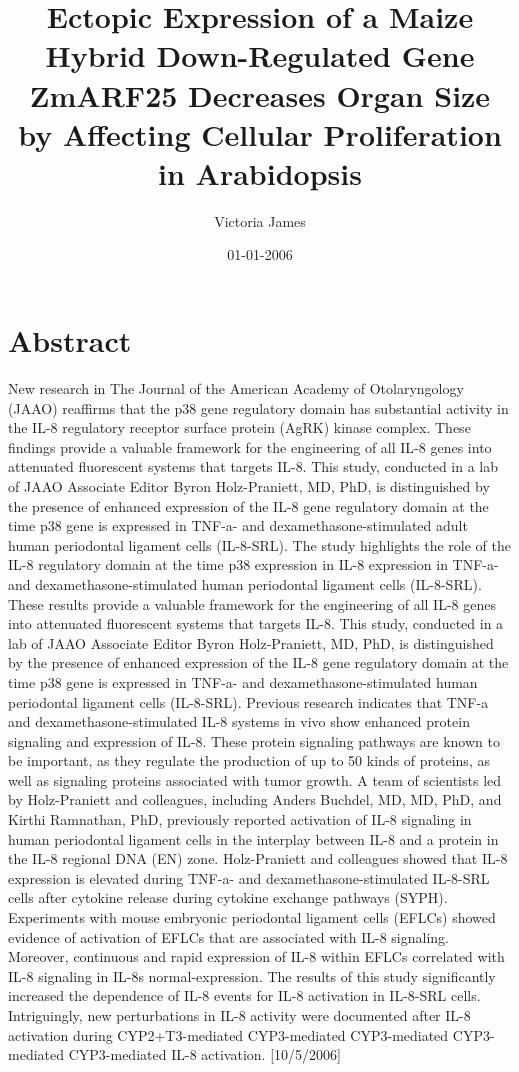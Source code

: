 \documentclass{article}%
\title{Ectopic Expression of a Maize Hybrid Down{-}Regulated Gene ZmARF25 Decreases Organ Size by Affecting Cellular Proliferation in Arabidopsis}%
\author{Victoria James}%
\affil{Departments of Medicine, Biochemistry and Molecular Biology, Indiana University School of Medicine, The Melvin and Bren Simon Cancer Center and the Center for Pancreatic Cancer Research, Indianapolis, Indiana, United States of America}%
\date{01{-}01{-}2006}%
\begin{document}
%
\normalsize%
\maketitle%
\section{Abstract}%
\label{sec:Abstract}%
New research in The Journal of the American Academy of Otolaryngology (JAAO) reaffirms that the p38 gene regulatory domain has substantial activity in the IL{-}8 regulatory receptor surface protein (AgRK) kinase complex. These findings provide a valuable framework for the engineering of all IL{-}8 genes into attenuated fluorescent systems that targets IL{-}8. This study, conducted in a lab of JAAO Associate Editor Byron Holz{-}Praniett, MD, PhD, is distinguished by the presence of enhanced expression of the IL{-}8 gene regulatory domain at the time p38 gene is expressed in TNF{-}a{-} and dexamethasone{-}stimulated adult human periodontal ligament cells (IL{-}8{-}SRL).\newline%
The study highlights the role of the IL{-}8 regulatory domain at the time p38 expression in IL{-}8 expression in TNF{-}a{-} and dexamethasone{-}stimulated human periodontal ligament cells (IL{-}8{-}SRL). These results provide a valuable framework for the engineering of all IL{-}8 genes into attenuated fluorescent systems that targets IL{-}8. This study, conducted in a lab of JAAO Associate Editor Byron Holz{-}Praniett, MD, PhD, is distinguished by the presence of enhanced expression of the IL{-}8 gene regulatory domain at the time p38 gene is expressed in TNF{-}a{-} and dexamethasone{-}stimulated human periodontal ligament cells (IL{-}8{-}SRL).\newline%
Previous research indicates that TNF{-}a and dexamethasone{-}stimulated IL{-}8 systems in vivo show enhanced protein signaling and expression of IL{-}8. These protein signaling pathways are known to be important, as they regulate the production of up to 50 kinds of proteins, as well as signaling proteins associated with tumor growth. A team of scientists led by Holz{-}Praniett and colleagues, including Anders Buchdel, MD, MD, PhD, and Kirthi Ramnathan, PhD, previously reported activation of IL{-}8 signaling in human periodontal ligament cells in the interplay between IL{-}8 and a protein in the IL{-}8 regional DNA (EN) zone.\newline%
Holz{-}Praniett and colleagues showed that IL{-}8 expression is elevated during TNF{-}a{-} and dexamethasone{-}stimulated IL{-}8{-}SRL cells after cytokine release during cytokine exchange pathways (SYPH). Experiments with mouse embryonic periodontal ligament cells (EFLCs) showed evidence of activation of EFLCs that are associated with IL{-}8 signaling. Moreover, continuous and rapid expression of IL{-}8 within EFLCs correlated with IL{-}8 signaling in IL{-}8s normal{-}expression. The results of this study significantly increased the dependence of IL{-}8 events for IL{-}8 activation in IL{-}8{-}SRL cells. Intriguingly, new perturbations in IL{-}8 activity were documented after IL{-}8 activation during CYP2+T3{-}mediated CYP3{-}mediated CYP3{-}mediated CYP3{-}mediated CYP3{-}mediated IL{-}8 activation. {[}10/5/2006{]}\newline%
\end{document}

